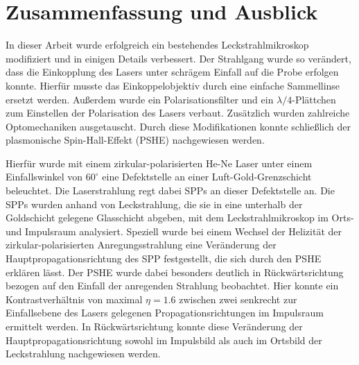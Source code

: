 \documentclass[titlepage,  ngerman]{article}
\begin{document}
	\newpage
	\section{Zusammenfassung und Ausblick}
	In dieser Arbeit wurde erfolgreich ein bestehendes Leckstrahlmikroskop modifiziert und in einigen Details verbessert. Der Strahlgang wurde so verändert, dass die Einkopplung des Lasers unter schrägem Einfall auf die Probe erfolgen konnte. Hierfür musste das Einkoppelobjektiv durch eine einfache Sammellinse ersetzt werden. Außerdem wurde ein Polarisationsfilter und ein $\lambda/4$-Plättchen zum Einstellen der Polarisation des Lasers verbaut. Zusätzlich wurden zahlreiche Optomechaniken ausgetauscht. Durch diese Modifikationen konnte schließlich der plasmonische Spin-Hall-Effekt (PSHE) nachgewiesen werden.
	
	Hierfür wurde mit einem zirkular-polarisierten He-Ne Laser unter einem Einfallswinkel von $60^\circ$ eine Defektstelle an einer Luft-Gold-Grenzschicht beleuchtet. Die Laserstrahlung regt dabei SPPs an dieser Defektstelle an. Die SPPs wurden anhand von Leckstrahlung, die sie in eine unterhalb der Goldschicht gelegene Glasschicht abgeben, mit dem Leckstrahlmikroskop im Orts- und Impulsraum analysiert. Speziell wurde bei einem Wechsel der Helizität der zirkular-polarisierten Anregungsstrahlung eine Veränderung der Hauptpropagationsrichtung des SPP festgestellt, die sich durch den PSHE erklären lässt. Der PSHE wurde dabei besonders deutlich in Rückwärtsrichtung bezogen auf den Einfall der anregenden Strahlung beobachtet. Hier konnte ein Kontrastverhältnis von maximal $\eta = 1.6$ zwischen zwei senkrecht zur Einfallsebene des Lasers gelegenen Propagationsrichtungen im Impulsraum ermittelt werden. In Rückwärtsrichtung konnte diese Veränderung der Hauptpropagationsrichtung sowohl im Impulsbild als auch im Ortsbild der Leckstrahlung nachgewiesen werden. 
		
\end{document}
